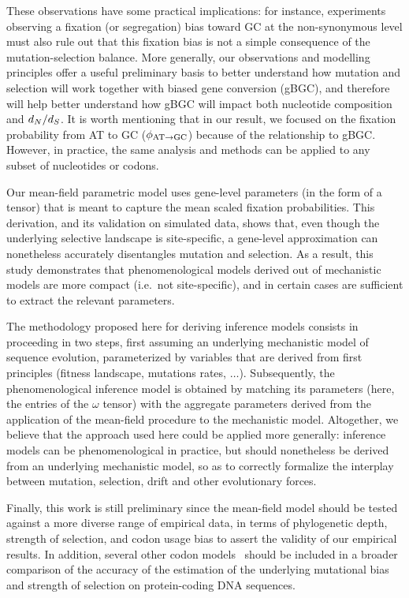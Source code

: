 \documentclass{article}
\begin{document}
These observations have some practical implications: for instance, experiments observing a fixation (or segregation) bias toward GC at the {non-synonymous} level must also rule out that this fixation bias is not a simple consequence of the mutation-selection balance.
More generally, our observations and modelling principles offer a useful preliminary basis to better understand how mutation and selection will work together with biased gene conversion ({gBGC}), and therefore will help better understand how {gBGC} will impact both nucleotide composition and $d_N / d_S$.
It is worth mentioning that in our result, we focused on the fixation probability from AT to GC ($\phi_{\text{AT} \rightarrow \text{GC}}$) because of the relationship to {gBGC}.
However, in practice, the same analysis and methods can be applied to any subset of nucleotides or codons.

Our mean-field parametric model uses gene-level parameters (in the form of a tensor) that is meant to capture the mean scaled fixation probabilities.
This derivation, and its validation on simulated data, shows that, even though the underlying selective landscape is site-specific, a gene-level approximation can nonetheless accurately disentangles mutation and selection.
As a result, this study demonstrates that phenomenological models derived out of mechanistic models are more compact (i.e.~not site-specific), and in certain cases are sufficient to extract the relevant parameters.

The methodology proposed here for deriving inference models consists in proceeding in two steps, first assuming an underlying mechanistic model of sequence evolution, parameterized by variables that are derived from first principles (fitness landscape, mutations rates, $\hdots$).
Subsequently, the phenomenological inference model is obtained by matching its parameters (here, the entries of the $\omega$ tensor) with the aggregate parameters derived from the application of the mean-field procedure to the mechanistic model.
Altogether, we believe that the approach used here could be applied more generally: inference models can be phenomenological in practice, but should nonetheless be derived from an underlying mechanistic model, so as to correctly formalize the interplay between mutation, selection, drift and other evolutionary forces.

Finally, this work is still preliminary since the mean-field model should be tested against a more diverse range of empirical data, in terms of phylogenetic depth, strength of selection, and {codon usage bias} to assert the validity of our empirical results.
In addition, several other codon models~\citep{Rodrigue2008a,KosakovskyPond2020} should be included in a broader comparison of the accuracy of the estimation of the underlying mutational bias and strength of selection on protein-coding {DNA} sequences.
\end{document}
